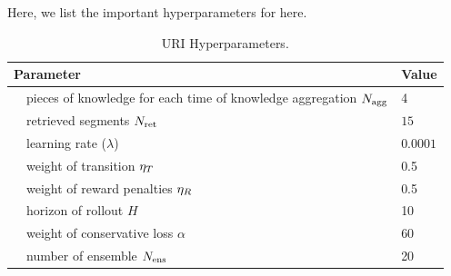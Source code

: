 Here, we list the important hyperparameters for \algo here.

\begin{table}[H]
	\renewcommand{\arraystretch}{1.1}
	\centering
	\caption{URI Hyperparameters.
 }
	\label{tab:params}
	\vspace{1mm}
	\begin{tabular}{l l| l }
	\toprule
	\multicolumn{2}{l|}{Parameter} &  Value\\
	\midrule
        & pieces of knowledge for each time of knowledge aggregation $N_{\rm agg}$ & 4 \\
        & retrieved segments $N_{\rm {ret}}$ & $15$ \\
	& learning rate ($\lambda$) & $0.0001$\\
	& weight of transition $\eta_T$ & 0.5\\
	& weight of reward penalties $\eta_R$ & 0.5\\
	& horizon of rollout $H$ & 10\\
 	& weight of conservative loss $\alpha$ & 60\\
        & number of ensemble $N_{\rm ens}$ & 20 \\
\bottomrule
\end{tabular}
\end{table} 





